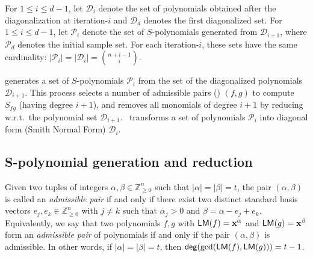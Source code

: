 \label{sec:pseudocode}
For $1 \le i \le d-1$, let $\mathcal{D}_i$ denote the set of polynomials obtained after the diagonalization at iteration-$i$ and $\mathcal{D}_d$ denotes the first diagonalized set.
For $1 \le i \le d-1$, let $\mathcal{P}_i$ denote the set of $S$-polynomials generated from $\mathcal{D}_{i+1}$, where $\mathcal{P}_d$ denotes the initial sample set. For each iteration-$i$, these sets have the same cardinality:
$|\mathcal{P}_i| = |\mathcal{D}_i| = \binom{n+i-1}{i}$.




 generates a set of $S$-polynomials $\mathcal{P}_i$ from the set of the diagonalized polynomials $\mathcal{D}_{i+1}$. This process selects a number of
admissible pairs () $(f,g)$ to compute $S_{fg}$ (having degree $i+1$), and removes all monomials of degree $i+1$ by reducing w.r.t.\ the polynomial set $\mathcal{D}_{i+1}$.
\algdiag\ transforms a set of polynomials $\mathcal{P}_i$ into diagonal form (Smith Normal Form) $\mathcal{D}_i$.



\subsection{S-polynomial generation and reduction}\label{sec:onspoly}
\begin{definition}\label{def:admissible-pair}
    Given two tuples of integers \(\alpha, \beta \in \mathbb{Z}_{\ge 0}^n\) such that \(|\alpha|=|\beta|=t\), the pair \((\alpha, \beta)\) is called an \emph{admissible pair} if and only if there exist two distinct standard basis vectors \(e_j, e_k \in \mathbb{Z}_{\ge 0}^n\) with \(j \neq k\) such that \(\alpha_j > 0\) and \(\beta = \alpha - e_j + e_k\). Equivalently, we say that two polynomials \(f, g\) with \(\mathsf{LM}(f) = \mathbf{x}^\alpha\) and \(\mathsf{LM}(g) = \mathbf{x}^\beta\) form an \emph{admissible pair} of polynomials if and only if the pair \((\alpha, \beta)\) is admissible. In other words, if \(|\alpha|=|\beta|=t\), then \(\mathsf{deg}(\gcd(\mathsf{LM}(f),\mathsf{LM}(g))) = t-1\).
\end{definition}


